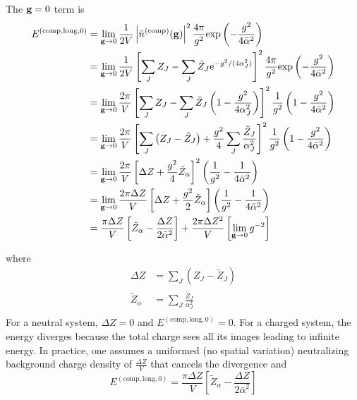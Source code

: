 \documentclass[paper=a4, fontsize=11pt]{article} %
\numberwithin{equation}{section} %
\numberwithin{figure}{section} %
\numberwithin{table}{section} %
\newcommand{\bg}{{\bf{g}}}
\newcommand{\rexp}{{\mathrm{exp}}}
\newcommand{\re}{{\mathrm{e}}}
\newcommand{\rlong}{{\mathrm{long}}}
\newcommand{\rcomp}{{\mathrm{comp}}}
\newcommand{\al}{{\alpha}}
\newcommand{\bal}{{\bar{\alpha}}}
\begin{document}
The $\bg = 0$ term is
\begin{equation}
\begin{split}
E^{(\rcomp,\rlong,0)}
&= \lim_{\bg \rightarrow 0} \frac{1}{2V} \left|\bar n ^{(\rcomp)}(\bg)\right|^2 \frac{4\pi}{g^2} \rexp\left(-\frac{g^2}{4\bal^2}\right) \\
&= \lim_{\bg \rightarrow 0} \frac{1}{2V} \left[\sum_J Z_J  -  \sum_J \tilde Z_J \re^{-g^2/(4\al_J^2)} \right]^2 \frac{4\pi}{g^2} \rexp\left(-\frac{g^2}{4\bal^2}\right) \\
&= \lim_{\bg \rightarrow 0} \frac{2\pi}{V} \left[\sum_J Z_J  -  \sum_J \tilde Z_J \left(1-\frac{g^2}{4\al_J^2}\right) \right]^2 \frac{1}{g^2} \left(1-\frac{g^2}{4\bal^2}\right) \\
&= \lim_{\bg \rightarrow 0} \frac{2\pi}{V} \left[\sum_J \left(Z_J  - \tilde Z_J\right) + \frac{g^2}{4} \sum_J \frac{\tilde Z_J}{\al_J^2}  \right]^2 \frac{1}{g^2} \left(1-\frac{g^2}{4\bal^2}\right) \\
&= \lim_{\bg \rightarrow 0} \frac{2\pi}{V} \left[\Delta Z + \frac{g^2}{4} \tilde Z_{\al}  \right]^2 \left(\frac{1}{g^2}-\frac{1}{4\bal^2}\right) \\
&= \lim_{\bg \rightarrow 0} \frac{2\pi \Delta Z}{V} \left[\Delta Z + \frac{g^2}{2}\tilde Z_{\al}  \right] \left(\frac{1}{g^2}-\frac{1}{4\bal^2}\right) \\
&= \frac{\pi\Delta Z}{V}\left[\tilde Z_\al - \frac{\Delta Z}{2\bal^2}\right] + \frac{2\pi\Delta Z^2}{V }\left[\lim_{\bg \rightarrow 0}  g^{-2} \right]
\end{split}
\end{equation}

where
\begin{equation}
\begin{split}
\Delta Z &= \sum_J \left(Z_J  - \tilde Z_J\right)\\
\tilde Z_\al &= \sum_J \frac{\tilde Z_J}{\al_J^2}\\
\end{split}
\end{equation}
For a neutral system, $\Delta Z = 0$ and $E^{(\rcomp,\rlong,0)} = 0$. For a charged system, the energy diverges because the total charge sees all its images leading to infinite energy. In practice, one assumes a uniformed (no spatial variation) neutralizing background charge density of $\frac{\Delta Z}{V}$ that cancels the divergence and 
\begin{equation}
E^{(\rcomp,\rlong,0)}=\frac{\pi\Delta Z}{V}\left[\tilde Z_\al - \frac{\Delta Z}{2\bal^2}\right]
\end{equation}
\end{document}
